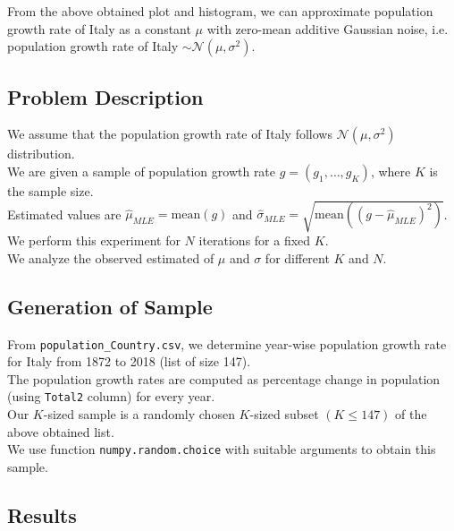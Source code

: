 \documentclass[fleqn, 11pt]{article}
\begin{document}
From the above obtained plot and histogram, we can approximate population growth rate of Italy as a constant $\mu$ with zero-mean additive Gaussian noise, i.e. population growth rate of Italy $\sim \mathcal{N}(\mu, \sigma^2)$. \\

\subsection{Problem Description}
We assume that the population growth rate of Italy follows $\mathcal{N}(\mu, \sigma^2)$ distribution. \\
We are given a sample of population growth rate $g = (g_1, \dots, g_K)$, where $K$ is the sample size. \\
Estimated values are $\hat{\mu}_{MLE} = \mathrm{mean}(g)$ and $\hat{\sigma}_{MLE} = \sqrt{ \mathrm{mean}((g - \hat{\mu}_{MLE})^2) }$. \\
We perform this experiment for $N$ iterations for a fixed $K$. \\
We analyze the observed estimated of $\mu$ and $\sigma$ for different $K$ and $N$. \\

\subsection{Generation of Sample}
From \verb!population_Country.csv!, we determine year-wise population growth rate for Italy from 1872 to 2018 (list of size 147). \\
The population growth rates are computed as percentage change in population (using \verb!Total2! column) for every year. \\
Our $K$-sized sample is a randomly chosen $K$-sized subset $(K \le 147)$ of the above obtained list. \\
We use function \verb!numpy.random.choice! with suitable arguments to obtain this sample. \\

\subsection{Results}
\end{document}
